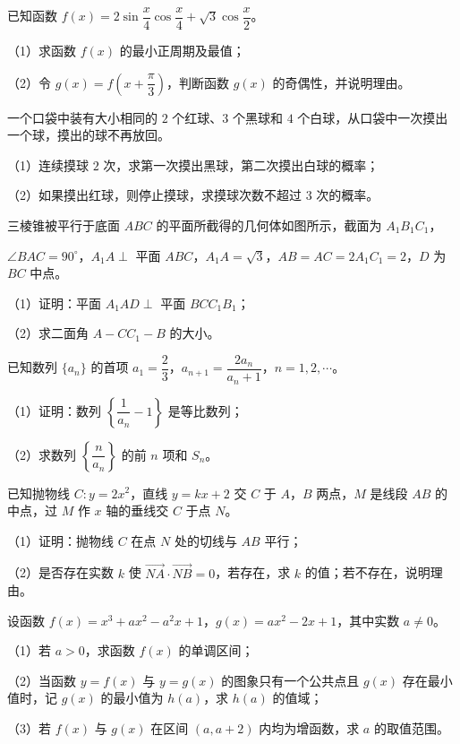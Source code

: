 \begin{question}
已知函数 $f(x)=2\sin\dfrac x4\cos\dfrac x4+\sqrt3\cos\dfrac x2$。

（1）求函数 $f(x)$ 的最小正周期及最值；

（2）令 $g(x)=f\left(x+\dfrac{\pi}3\right)$，判断函数 $g(x)$ 的奇偶性，并说明理由。

\end{question}
\begin{question}
一个口袋中装有大小相同的 $2$ 个红球、$3$ 个黑球和 $4$ 个白球，从口袋中一次摸出一个球，摸出的球不再放回。

（1）连续摸球 $2$ 次，求第一次摸出黑球，第二次摸出白球的概率；

（2）如果摸出红球，则停止摸球，求摸球次数不超过 $3$ 次的概率。

\Needspace{0.4\textheight}
\end{question}
\begin{question}
三棱锥被平行于底面 $ABC$ 的平面所截得的几何体如图所示，截面为 $A_1B_1C_1$，

$\angle BAC=90^\circ$，$A_1A\perp$ 平面 $ABC$，$A_1A=\sqrt3$，$AB=AC=2A_1C_1=2$，$D$ 为 $BC$ 中点。

（1）证明：平面 $A_1AD\perp$ 平面 $BCC_1B_1$；

（2）求二面角 $A-CC_1-B$ 的大小。
\nopagebreak[4]
\begin{center}\end{center}
\nopagebreak[4]
\end{question}
\begin{question}
已知数列 $\{a_n\}$ 的首项 $a_1=\dfrac23$，$a_{n+1}=\dfrac{2a_n}{a_n+1}$，$n=1,2,\cdots$。

（1）证明：数列 $\left\{\dfrac1{a_n}-1\right\}$ 是等比数列；

（2）求数列 $\left\{\dfrac n{a_n}\right\}$ 的前 $n$ 项和 $S_n$。

\end{question}
\begin{question}
已知抛物线 $C:y=2x^2$，直线 $y=kx+2$ 交 $C$ 于 $A$，$B$ 两点，$M$ 是线段 $AB$ 的中点，过 $M$ 作 $x$ 轴的垂线交 $C$ 于点 $N$。

（1）证明：抛物线 $C$ 在点 $N$ 处的切线与 $AB$ 平行；

（2）是否存在实数 $k$ 使 $\overrightarrow{NA}\cdot\overrightarrow{NB}=0$，若存在，求 $k$ 的值；若不存在，说明理由。

\end{question}
\begin{question}
设函数 $f(x)=x^3+ax^2-a^2x+1$，$g(x)=ax^2-2x+1$，其中实数 $a\neq0$。

（1）若 $a>0$，求函数 $f(x)$ 的单调区间；

（2）当函数 $y=f(x)$ 与 $y=g(x)$ 的图象只有一个公共点且 $g(x)$ 存在最小值时，记 $g(x)$ 的最小值为 $h(a)$，求 $h(a)$ 的值域；

（3）若 $f(x)$ 与 $g(x)$ 在区间 $(a,a+2)$ 内均为增函数，求 $a$ 的取值范围。

\end{question}